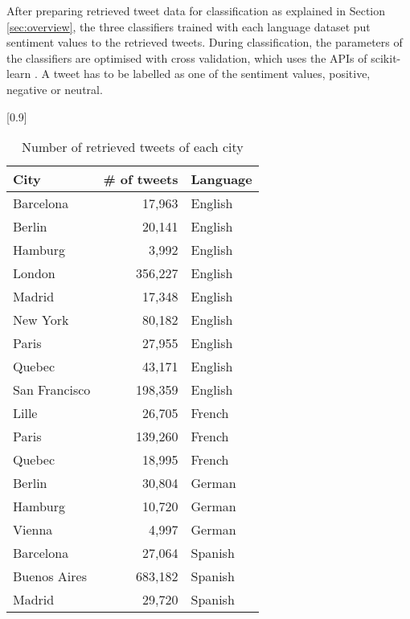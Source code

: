 \documentclass[twocolumn]{article}
\begin{document}
After preparing retrieved tweet data for classification as explained in Section \ref{sec:overview}, the three classifiers trained with each language dataset put sentiment values to the retrieved tweets.
During classification, the parameters of the classifiers are optimised with cross validation, which uses the APIs of scikit-learn \cite{scikit}.
A tweet has to be labelled as one of the sentiment values, positive, negative or neutral.

\begin{table}[ht]
	\caption{Number of retrieved tweets of each city}
	\scalebox{1.0}[0.9]{
	\begin{tabular}{|l|r|l|} \hline
	City&\# of tweets&Language\\ \hline \hline
	Barcelona & 17,963 & English \\ \hline
	Berlin & 20,141 & English\\ \hline
	Hamburg & 3,992 & English\\ \hline
	London  & 356,227& English\\ \hline
	Madrid & 17,348 & English \\ \hline
	New York  & 80,182  & English\\ \hline
	Paris & 27,955 & English \\ \hline
	Quebec & 43,171 & English \\ \hline
	San Francisco & 198,359  & English\\ \hline
	Lille & 26,705  & French\\ \hline
	Paris & 139,260 & French\\ \hline
	Quebec & 18,995 & French\\ \hline
	Berlin & 30,804 & German\\ \hline
	Hamburg & 10,720 & German\\ \hline
	Vienna & 4,997  & German\\ \hline
	Barcelona&27,064 & Spanish\\ \hline
	Buenos Aires&683,182  & Spanish\\ \hline
	Madrid& 29,720 & Spanish\\ \hline
	\end{tabular}
	}
	\label{tab:cities}
\end{table}

\vspace{-6mm}
\end{document}
